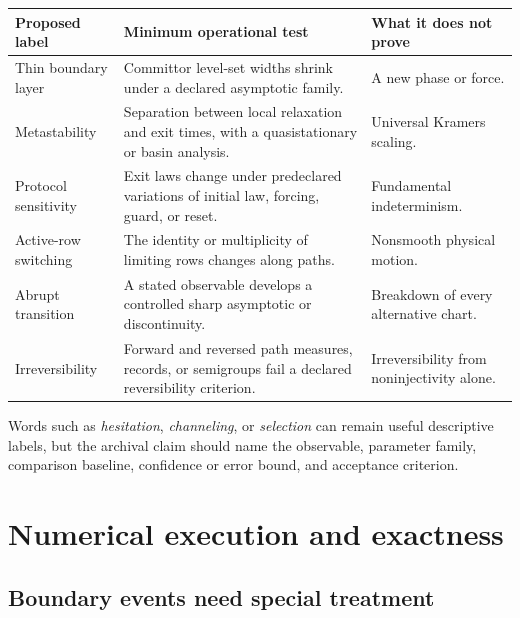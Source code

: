 \documentclass[11pt]{article}
\theoremstyle{definition}
\theoremstyle{remark}
\begin{document}
\begin{center}
\begin{tabularx}{\textwidth}{@{}L{0.23\textwidth}Y Y@{}}
\toprule
Proposed label & Minimum operational test & What it does not prove \\
\midrule
Thin boundary layer
& Committor level-set widths shrink under a declared asymptotic family.
& A new phase or force.\\

Metastability
& Separation between local relaxation and exit times, with a
  quasistationary or basin analysis.
& Universal Kramers scaling.\\

Protocol sensitivity
& Exit laws change under predeclared variations of initial law, forcing,
  guard, or reset.
& Fundamental indeterminism.\\

Active-row switching
& The identity or multiplicity of limiting rows changes along paths.
& Nonsmooth physical motion.\\

Abrupt transition
& A stated observable develops a controlled sharp asymptotic or
  discontinuity.
& Breakdown of every alternative chart.\\

Irreversibility
& Forward and reversed path measures, records, or semigroups fail a
  declared reversibility criterion.
& Irreversibility from noninjectivity alone.\\
\bottomrule
\end{tabularx}
\end{center}

Words such as \emph{hesitation}, \emph{channeling}, or \emph{selection}
can remain useful descriptive labels, but the archival claim should name
the observable, parameter family, comparison baseline, confidence or
error bound, and acceptance criterion.

\section{Numerical execution and exactness}
\label{sec:numerics}

\subsection{Boundary events need special treatment}
\end{document}
